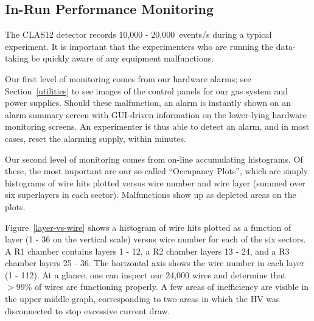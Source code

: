\subsection{In-Run Performance Monitoring}

The CLAS12 detector records 10,000 - 20,000~events/s during a typical experiment.
It is important that the experimenters who are running the data-taking be quickly
aware of any equipment malfunctions.

Our first level of monitoring comes from our hardware alarms; see Section~\ref{utilities}
to see images of the control panels for our gas system and power
supplies.  Should these malfunction, an alarm is instantly shown on an alarm summary
screen with GUI-driven information on the lower-lying hardware monitoring screens.
An experimenter is thus able to detect an alarm, and in most cases, reset the
alarming supply, within minutes.

Our second level of monitoring comes from on-line accumulating histograms.
Of these, the most important are our so-called ``Occupancy Plots'', which
are simply histograms of wire hits plotted versus wire number and wire layer (summed over
six superlayers in each sector).  Malfunctions show up
as depleted areas on the plots.

Figure~\ref{layer-vs-wire} shows a histogram of wire hits plotted as
a function of layer (1 - 36 on the vertical scale) versus wire number for each of the six
sectors.  A R1 chamber contains layers 1 - 12, a R2 chamber layers 13 - 24, and a 
R3 chamber layers 25 - 36. The horizontal axis shows the wire number in each layer (1 - 112).  
At a glance, one can inspect our 24,000 wires and determine
that $>99\%$ of wires are functioning properly.  A few areas of inefficiency
are visible in the upper middle graph, corresponding to
two areas in which the HV was disconnected to stop excessive current draw.

